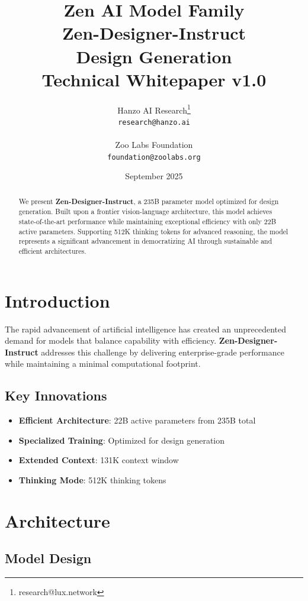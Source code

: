 \documentclass[11pt,a4paper]{article}
\title{
    \vspace{-2cm}
    \Large \textbf{Zen AI Model Family} \\
    \vspace{0.5cm}
    \Huge \textbf{Zen-Designer-Instruct} \\
    \vspace{0.3cm}
    \large Design Generation \\
    \vspace{0.5cm}
    \normalsize Technical Whitepaper v1.0
}
\author{
    Hanzo AI Research\thanks{research@lux.network} \\
    \texttt{research@hanzo.ai} \\
    \\
    Zoo Labs Foundation \\
    \texttt{foundation@zoolabs.org}
}
\date{September 2025}
\begin{document}
\maketitle

\begin{abstract}
We present \textbf{Zen-Designer-Instruct}, a 235B parameter model optimized for design generation. 
Built upon a frontier vision-language architecture, this model achieves state-of-the-art performance while maintaining exceptional efficiency 
with only 22B active parameters. Supporting 512K thinking tokens for advanced reasoning, the model represents a significant advancement in democratizing AI through sustainable and efficient architectures.
\end{abstract}

\tableofcontents
\newpage

\section{Introduction}

The rapid advancement of artificial intelligence has created an unprecedented demand for models that balance capability with efficiency. 
\textbf{Zen-Designer-Instruct} addresses this challenge by delivering enterprise-grade performance while maintaining a minimal computational footprint.

\subsection{Key Innovations}
\begin{itemize}
    \item \textbf{Efficient Architecture}: 22B active parameters from 235B total
    \item \textbf{Specialized Training}: Optimized for design generation
    \item \textbf{Extended Context}: 131K context window
    \item \textbf{Thinking Mode}: 512K thinking tokens
\end{itemize}
    
    

\section{Architecture}

\subsection{Model Design}
\end{document}
